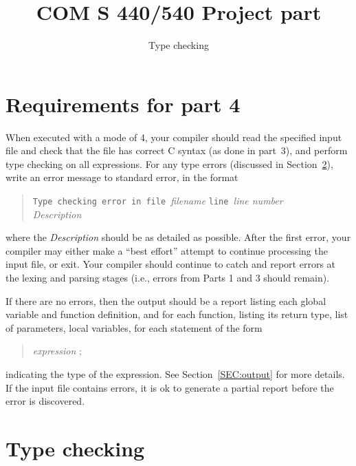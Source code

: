 \documentclass{article}
\title{COM S 440/540 Project part \typecheck}
\author{Type checking}
\date{}
\newcommand{\parser}{3}
\newcommand{\typecheck}{4}
\begin{document}
\maketitle


\section{Requirements for part \typecheck}

When executed with a mode of \typecheck,
your compiler should read the specified input file
and check that the file has correct C syntax
(as done in part~\parser),
and perform type checking on all expressions.
For any type errors (discussed in Section~\ref{SEC:types}),
write an error message to standard error, in the format
\begin{quote}
  \begin{tabbing}
		{\tt Type ch}\={\tt ecking error in file }\emph{filename}
		{\tt line }\emph{line number}
	\\
		\> \emph{Description}
  \end{tabbing}
\end{quote}
where the \emph{Description} should be as detailed as possible.
After the first error,
your compiler may either make a ``best effort''
attempt to continue processing the input file, or exit.
Your compiler should continue to catch and report errors
at the lexing and parsing stages
(i.e., errors from Parts 1 and \parser{} should remain).

If there are no errors,
then the output should be a report
listing each global variable
and function definition,
and for each function,
listing its return type,
list of parameters,
local variables,
for each statement of the form
\begin{quote}
\emph{expression} ;
\end{quote}
indicating the type of the expression.
See Section~\ref{SEC:output}
for more details.
If the input file contains errors,
it is ok to generate a partial report
before the error is discovered.

\section{Type checking} \label{SEC:types}
\end{document}
